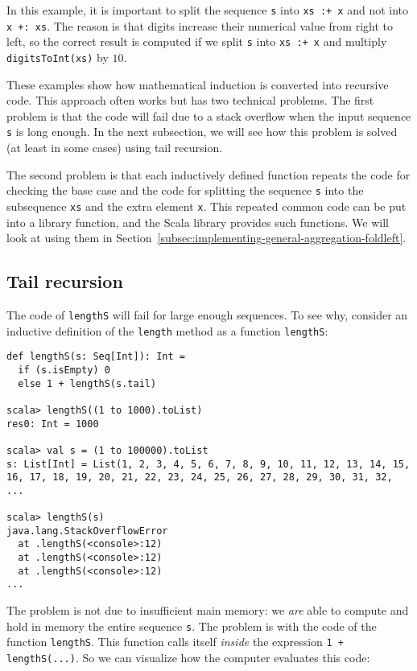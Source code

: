 \noindent In this example, it is important to split the sequence \lstinline!s!
into \lstinline!xs :+ x! and not into \lstinline!x +: xs!. The reason
is that digits increase their numerical value from right to left,
so the correct result is computed if we split \lstinline!s! into
\lstinline!xs :+ x! and multiply \lstinline!digitsToInt(xs)! by
$10$.

These examples show how mathematical induction is converted into recursive
code. This approach often works but has two technical problems. The
first problem is that the code will fail due to a stack overflow when
the input sequence \lstinline!s! is long enough. In the next subsection,
we will see how this problem is solved (at least in some cases) using
tail recursion. 

The second problem is that each inductively defined function repeats
the code for checking the base case and the code for splitting the
sequence \lstinline!s! into the subsequence \lstinline!xs! and the
extra element \lstinline!x!. This repeated common code can be put
into a library function, and the Scala library provides such functions.
We will look at using them in Section~\ref{subsec:implementing-general-aggregation-foldleft}.

\subsection{Tail recursion\label{subsec:Tail-recursion}}

The code of \lstinline!lengthS! will fail for large enough sequences.
To see why, consider an inductive definition of the \lstinline!length!
method as a function \lstinline!lengthS!:
\begin{lstlisting}
def lengthS(s: Seq[Int]): Int =
  if (s.isEmpty) 0
  else 1 + lengthS(s.tail)

scala> lengthS((1 to 1000).toList)
res0: Int = 1000

scala> val s = (1 to 100000).toList
s: List[Int] = List(1, 2, 3, 4, 5, 6, 7, 8, 9, 10, 11, 12, 13, 14, 15, 16, 17, 18, 19, 20, 21, 22, 23, 24, 25, 26, 27, 28, 29, 30, 31, 32, ...

scala> lengthS(s)
java.lang.StackOverflowError
  at .lengthS(<console>:12)
  at .lengthS(<console>:12)
  at .lengthS(<console>:12)
...
\end{lstlisting}
The problem is not due to insufficient main memory: we \emph{are}
able to compute and hold in memory the entire sequence \lstinline!s!.
The problem is with the code of the function \lstinline!lengthS!.
This function calls itself \emph{inside} the expression \lstinline!1 + lengthS(...)!.
So we can visualize how the computer evaluates this code:

